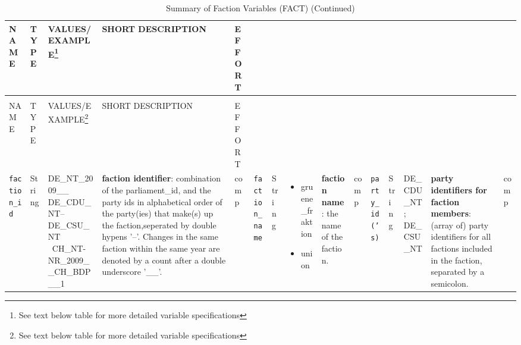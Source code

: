 \documentclass{article}
\begin{document}
    \begin{longtable}[H!]
        {|m{}|
          m{}|
          m{}| 
          m{}|
          m{}|} 

\caption{Summary of Faction Variables (\gls{FACT})}
\label{FACTtab}
 \\\hline NAME & TYPE & VALUES/EXAMPLE\footnote{See text below table for more detailed variable specifications} & SHORT DESCRIPTION & EFFORT \\ \hline
\endfirsthead

\caption[]{Summary of Faction Variables (\gls{FACT}) (Continued)}
\\\hline NAME & TYPE & VALUES/EXAMPLE\footnote{See text below table for more detailed variable specifications} & SHORT DESCRIPTION & EFFORT \\ \hline
\endhead
         \texttt{faction\_id}
         &
         String
         & 
    DE\_NT\_2009\_\_ DE\_CDU\_NT--DE\_CSU\_NT
     \
     CH\_NT-NR\_2009\_\_CH\_BDP\_\_1
     &
     \textbf{faction identifier}: combination of the parliament\_id, and the party ids in alphabetical order of the party(ies) that make(s) up the faction,seperated by double hypens '--'. Changes in the same faction within the same year are denoted by a count after a double underscore '\_\_'.
     &
    \gls{comp} &
    
        \hline
   
        \texttt{faction\_name}
         &
         String
         & 
         \begin{itemize}
             \item gruene\_fraktion
             \item union
         \end{itemize}
         &    
    \textbf{faction name}: the name of the faction.
      &
    \gls{comp} &
    
        \hline   
     
         \texttt{party\_id('s)} 
         &
         String
         & 
         DE\_CDU\_NT; DE\_CSU\_NT
         
         &    
    \textbf{party identifiers for faction members}: (array of) party identifiers for all factions included in the faction, separated by a semicolon.
      &
    \gls{comp} &
    

\end{longtable}
\end{document}
